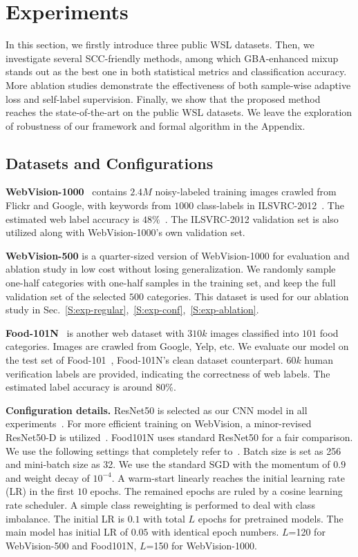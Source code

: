 \documentclass[runningheads]{llncs}
\begin{document}
\section{Experiments}
In this section, we firstly introduce three public WSL datasets. Then, we investigate several SCC-friendly methods, among which GBA-enhanced mixup stands out as the best one in both statistical metrics and classification accuracy. More ablation studies demonstrate the effectiveness of both sample-wise adaptive loss and self-label supervision. Finally, we show that the proposed method reaches the state-of-the-art on the public WSL datasets. We leave the exploration of robustness of our framework and formal algorithm in the Appendix.

\subsection{Datasets and Configurations}
\label{S:Dataset}
\textbf{WebVision-1000}~\cite{li2017WebVision} contains $2.4M$ noisy-labeled training images crawled from Flickr and Google, with keywords from $1000$ class-labels in ILSVRC-2012~\cite{deng2009imagenet}.
The estimated web label accuracy is $48\%$~\cite{guo2018curriculumnet}. 
The ILSVRC-2012 validation set is also utilized along with WebVision-1000's own validation set.

\textbf{WebVision-500} is a quarter-sized version of WebVision-1000 for evaluation and ablation study in low cost without losing generalization. We randomly sample one-half categories with one-half samples in the training set, and keep the full validation set of the selected $500$ categories. This dataset is used for our ablation study in Sec.~\ref{S:exp-regular},~\ref{S:exp-conf},~\ref{S:exp-ablation}. 

\textbf{Food-101N}~\cite{lee2018cleannet} is another web dataset with $310k$ images classified into $101$ food categories. Images are crawled from Google, Yelp, etc. We evaluate our model on the test set of Food-101~\cite{bossard2014food}, Food-101N's clean dataset counterpart. $60k$ human verification labels are provided, indicating the correctness of web labels. The estimated label accuracy is around $80\%$.

\textbf{Configuration details.}
ResNet50 is selected as our CNN model in all experiments~\cite{he2016deep}. 
For more efficient training on WebVision, a minor-revised ResNet50-D is utilized~\cite{he2019bag}. Food101N uses standard ResNet50 for a fair comparison.
We use the following settings that completely refer to~\cite{he2019bag}.
Batch size is set as 256 and mini-batch size as 32. We use the standard SGD with the momentum of $0.9$ and weight decay of $10^{-4}$. A warm-start linearly reaches the initial learning rate (LR) in the first $10$ epochs. The remained epochs are ruled by a cosine learning rate scheduler. A simple class reweighting is performed to deal with class imbalance. The initial LR is $0.1$ with total $L$ epochs for pretrained models. The main model has initial LR of $0.05$ with identical epoch numbers. $L$=120 for WebVision-500 and Food101N, $L$=150 for WebVision-1000.
	
\end{document}
